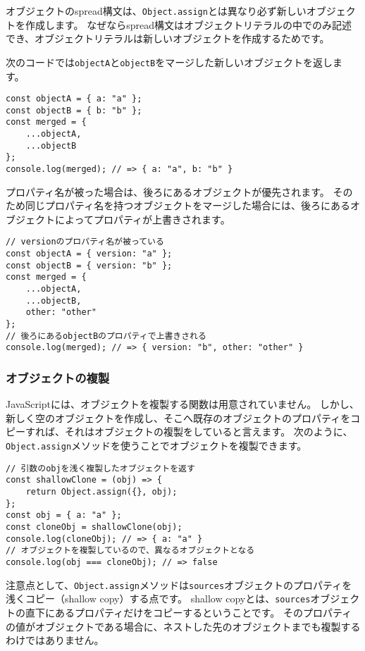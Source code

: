 オブジェクトのspread構文は、\texttt{Object.assign}とは異なり必ず新しいオブジェクトを作成します。
なぜならspread構文はオブジェクトリテラルの中でのみ記述でき、オブジェクトリテラルは新しいオブジェクトを作成するためです。

次のコードでは\texttt{objectA}と\texttt{objectB}をマージした新しいオブジェクトを返します。

\begin{lstlisting}
const objectA = { a: "a" };
const objectB = { b: "b" };
const merged = {
    ...objectA,
    ...objectB
};
console.log(merged); // => { a: "a", b: "b" }
\end{lstlisting}

プロパティ名が被った場合は、後ろにあるオブジェクトが優先されます。
そのため同じプロパティ名を持つオブジェクトをマージした場合には、後ろにあるオブジェクトによってプロパティが上書きされます。

\begin{lstlisting}
// versionのプロパティ名が被っている
const objectA = { version: "a" };
const objectB = { version: "b" };
const merged = {
    ...objectA,
    ...objectB,
    other: "other"
};
// 後ろにあるobjectBのプロパティで上書きされる
console.log(merged); // => { version: "b", other: "other" }
\end{lstlisting}

\hypertarget{copy}{%
\subsubsection{オブジェクトの複製}\label{copy}}

JavaScriptには、オブジェクトを複製する関数は用意されていません。
しかし、新しく空のオブジェクトを作成し、そこへ既存のオブジェクトのプロパティをコピーすれば、それはオブジェクトの複製をしていると言えます。
次のように、\texttt{Object.assign}メソッドを使うことでオブジェクトを複製できます。

\begin{lstlisting}
// 引数のobjを浅く複製したオブジェクトを返す
const shallowClone = (obj) => {
    return Object.assign({}, obj);
};
const obj = { a: "a" };
const cloneObj = shallowClone(obj);
console.log(cloneObj); // => { a: "a" }
// オブジェクトを複製しているので、異なるオブジェクトとなる
console.log(obj === cloneObj); // => false
\end{lstlisting}

注意点として、\texttt{Object.assign}メソッドは\texttt{sources}オブジェクトのプロパティを浅くコピー（shallow
copy）する点です。 shallow
copyとは、\texttt{sources}オブジェクトの直下にあるプロパティだけをコピーするということです。
そのプロパティの値がオブジェクトである場合に、ネストした先のオブジェクトまでも複製するわけではありません。

